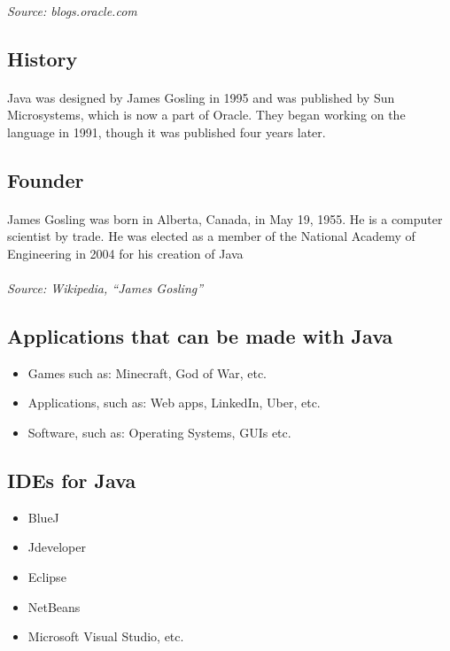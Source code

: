 \documentclass{article}
\begin{document}
	\paragraph{}\textit{Source: blogs.oracle.com}
	\subsection{History}
	\paragraph{}Java was designed by James Gosling in 1995 and was published by Sun Microsystems, which is now a part of Oracle.
	They began working on the language in 1991, though it was published four years later.
	\subsection{Founder}
	\paragraph{}James Gosling was born in Alberta, Canada, in May 19, 1955.
	He is a computer scientist by trade.
	He was elected as a member of the National Academy of Engineering in 2004 for his creation of Java
	\paragraph{}\textit{Source: Wikipedia, “James Gosling”}
	\subsection{Applications that can be made with Java}
	\begin{itemize}
	\item Games such as: Minecraft, God of War, etc.
	\item Applications, such as: Web apps, LinkedIn, Uber, etc.
	\item Software, such as: Operating Systems, GUIs etc.
	\end{itemize}
	\subsection{IDEs for Java}
	\begin{itemize}
	\item BlueJ
	\item Jdeveloper
	\item Eclipse
	\item NetBeans
	\item Microsoft Visual Studio, etc.
	\end{itemize}
\end{document}
